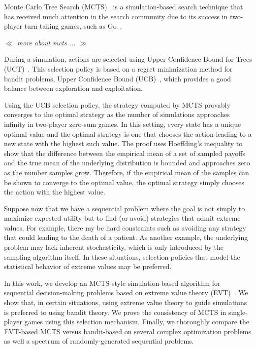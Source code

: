 \documentclass[runningheads,a4paper]{llncs}
\newcommand{\toexpand}[1]{{\it $\ll$ #1 ... $\gg$ }}
\begin{document}
Monte Carlo Tree Search (MCTS)~\cite{Coulom06,Kocsis06Bandit} is a simulation-based search technique that has received much attention in the search community due to its success in two-player turn-taking games, such as Go~\cite{Gelly12Grand}. 

\toexpand{more about mcts}

During a simulation, actions are selected using Upper Confidence Bound for Trees (UCT)~\cite{Kocsis06Bandit}. This selection policy is based on a regret minimization method for bandit problems, Upper Confidence Bound (UCB)~\cite{Auer02Finite}, which provides a good balance between exploration and exploitation. 

Using the UCB selection policy, the strategy computed by MCTS provably converges to the optimal strategy as the number of simulations approaches 
infinity in two-player zero-sum games. 
In this setting, every state has a unique optimal value and the optimal strategy is one that chooses the action leading to a new state with the highest such value. 
The proof uses Hoeffding's inequality to show that the difference between the empirical mean of a set of sampled payoffs and the true mean of the underlying distribution is bounded and approaches zero as the number samples grow. 
Therefore, if the empirical mean of the samples can be shown to converge to the optimal value, the optimal strategy simply chooses the action with the highest value. 

Suppose now that we have a sequential problem where the goal is not simply to maximize expected utility but to find (or avoid) 
strategies that admit extreme values. 
For example, there my be hard constraints such as avoiding any strategy that could leading to the death of a patient.
As another example, the underlying problem may lack inherent stochasticity, which is only introduced by the sampling 
algorithm itself. In these situations, selection policies that model the statistical behavior of extreme values 
may be preferred. 

In this work, we develop an MCTS-style simulation-based algorithm for sequential decision-making problems based on extreme value 
theory (EVT)~\cite{Coles01Introduction}. We show that, in certain situations, using extreme value theory to guide simulations 
is preferred to using bandit theory. We prove the consistency of MCTS in single-player games using this selection mechanism. 
Finally, we thoroughly compare the EVT-based MCTS versus bandit-based on several complex optimization problems as well a spectrum 
of randomly-generated sequential problems.
\end{document}
